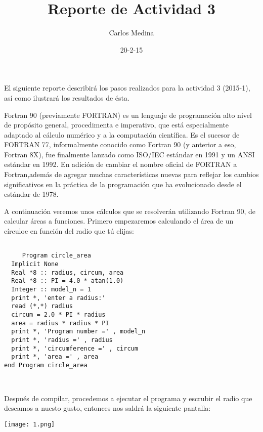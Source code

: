 \documentclass[12pt]{article}
\title{Reporte de Actividad 3}
\author{Carlos Medina}
\date{20-2-15}
\begin{document}
\maketitle


El siguiente reporte describirá los pasos realizados para la actividad 3 (2015-1), así como ilustrará los resultados de ésta.




\hspace {0.5cm} Fortran 90 (previamente FORTRAN) es un lenguaje de programación alto nivel de propósito general, procedimenta e imperativo, que está especialmente adaptado al cálculo numérico y a la computación científica. Es el sucesor de FORTRAN 77, informalmente conocido como Fortran 90 (y anterior a eso, Fortran 8X), fue finalmente lanzado como ISO/IEC estándar en 1991 y un ANSI estándar en 1992. En adición de cambiar el nombre oficial de FORTRAN a Fortran,además de agregar muchas características nuevas para reflejar los cambios significativos en la práctica de la programación que ha evolucionado desde el estándar de 1978.




\hspace {0.5cm} A continuación veremos unos cálculos que se resolverán utilizando Fortran 90, de calcular áreas a funciones.
\vspace {0.5cm}
     Primero empezaremos calculando el área de un círculoe en función del radio que tú elijas:
     
     \begin{verbatim}
     
     Program circle_area
  Implicit None
  Real *8 :: radius, circum, area
  Real *8 :: PI = 4.0 * atan(1.0)
  Integer :: model_n = 1
  print *, 'enter a radius:'
  read (*,*) radius
  circum = 2.0 * PI * radius
  area = radius * radius * PI 
  print *, 'Program number =' , model_n
  print *, 'radius =' , radius
  print *, 'circumference =' , circum
  print *, 'area =' , area
end Program circle_area 
 
    
     \end{verbatim}
     
Después de compilar, procedemos a ejecutar el programa y escrubir el radio que deseamos a nuesto gusto, entonces nos saldrá la siguiente pantalla:
   
     \vspace{2cm}

	\begin{center}
	\texttt{[image: 1.png]}\\
	\end{center}
	
\end{document}
